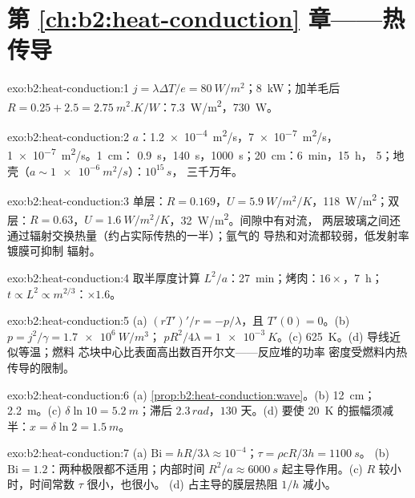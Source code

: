 \section*{第 \ref{ch:b2:heat-conduction} 章——热传导}

\begin{solution}{exo:b2:heat-conduction:1}
$j = \lambda\Delta T/e = \qty{80}{W/m^2}$；\qty{8}{kW}；加羊毛后 $R = 0.25 + 2.5 =
\qty{2.75}{m^2.K/W}$：\qty{7.3}{W/m^2}，\qty{730}{W}。
\end{solution}

\begin{solution}{exo:b2:heat-conduction:2}
$a$：\qty{1.2e-4}{m^2/s}，\qty{7e-7}{m^2/s}，\qty{1e-7}{m^2/s}。\qty{1}{cm}：
\qty{0.9}{s}，\qty{140}{s}，\qty{1000}{s}；\qty{20}{cm}：\qty{6}{min}，\qty{15}{h}，
\qty{5}{}；地壳（$a \sim \qty{1e-6}{m^2/s}$）：$10^{15}\,\unit{s}$，
三千万年。
\end{solution}

\begin{solution}{exo:b2:heat-conduction:3}
单层：$R = 0.169$，$U = \qty{5.9}{W/m^2/K}$，\qty{118}{W/m^2}；双层：$R =
0.63$，$U = \qty{1.6}{W/m^2/K}$，\qty{32}{W/m^2}。间隙中有对流，
两层玻璃之间还通过辐射交换热量（约占实际传热的一半）；氩气的
导热和对流都较弱，低发射率镀膜可抑制
辐射。
\end{solution}

\begin{solution}{exo:b2:heat-conduction:4}
取半厚度计算 $L^2/a$：\qty{27}{min}；烤肉：$16\times$，\qty{7}{h}；
$t \propto L^2 \propto m^{2/3}$：$\times 1.6$。
\end{solution}

\begin{solution}{exo:b2:heat-conduction:5}
(a) $(rT')'/r = -p/\lambda$，且 $T'(0) = 0$。(b) $p = j^2/\gamma = \qty{1.7e6}{W/m^3}$；
$pR^2/4\lambda = \qty{1e-3}{K}$。(c) \qty{625}{K}。(d) 导线近似等温；燃料
芯块中心比表面高出数百开尔文——反应堆的功率
密度受燃料内热传导的限制。
\end{solution}

\begin{solution}{exo:b2:heat-conduction:6}
(a) \cref{prop:b2:heat-conduction:wave}。(b) \qty{12}{cm}；\qty{2.2}{m}。(c)
$\delta\ln 10 = \qty{5.2}{m}$；滞后 $2.3\,\unit{rad}$，$130$ 天。(d) 要使
\qty{20}{K} 的振幅须减半：$x = \delta\ln 2 = \qty{1.5}{m}$。
\end{solution}

\begin{solution}{exo:b2:heat-conduction:7}
(a) $\mathrm{Bi} = hR/3\lambda \approx 10^{-4}$；$\tau = \rho cR/3h = \qty{1100}{s}$。
(b) $\mathrm{Bi} = 1.2$：两种极限都不适用；内部时间 $R^2/a \approx
\qty{6000}{s}$ 起主导作用。(c) $R$ 较小时，时间常数 $\tau$ 很小，也很小。
(d) 占主导的膜层热阻 $1/h$ 减小。
\end{solution}

